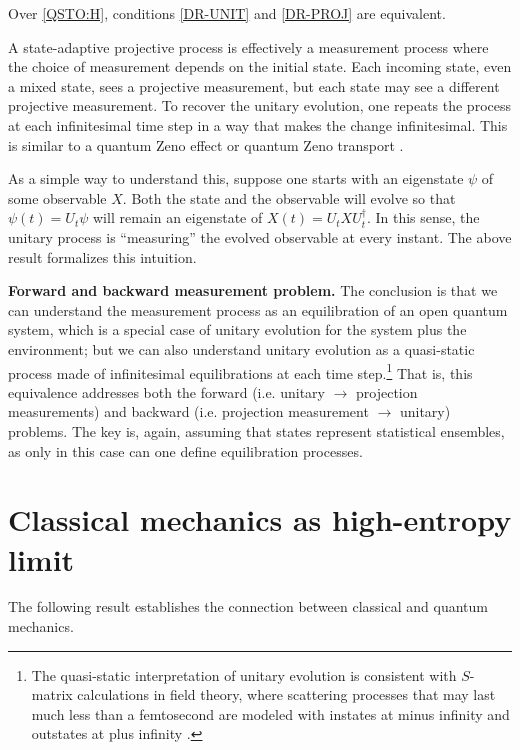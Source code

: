 \documentclass[entropy,article,submit,moreauthors]{Definitions/mdpi}
\begin{document}
\begin{Theorem}
	Over \ref{QSTO:H}, conditions \ref{DR-UNIT} and \ref{DR-PROJ} are equivalent.
\end{Theorem}

A state-adaptive projective process is effectively a measurement process where the choice of measurement depends on the initial state. Each incoming state, even a mixed state, sees a projective measurement, but each state may see a different projective measurement. To recover the unitary evolution, one repeats the process at each infinitesimal time step in a way that makes the change infinitesimal. This is similar to a quantum Zeno effect or quantum Zeno transport \cite{FacchiPascazio2008,BurgarthEtAl2013}.

As a simple way to understand this, suppose one starts with an eigenstate $\psi$ of some observable $X$. Both the state and the observable will evolve so that $\psi(t) = U_t \psi$ will remain an eigenstate of $X(t) = U_t X U^\dagger_t$. In this sense, the unitary process is ``measuring'' the evolved observable at every instant. The above result formalizes this intuition.

\textbf{Forward and backward measurement problem.} The conclusion is that we can understand the measurement process as an equilibration of an open quantum system, which is a special case of unitary evolution for the system plus the environment; but we can also understand unitary evolution as a quasi-static process made of infinitesimal equilibrations at each time step.\footnote{The quasi-static interpretation of unitary evolution is consistent with $S$-matrix calculations in field theory, where scattering processes that may last much less than a femtosecond are modeled with instates at minus infinity and outstates at plus infinity \cite{Weinberg1995}.} That is, this equivalence addresses both the forward (i.e. unitary $\to$ projection measurements) and backward (i.e. projection measurement $\to$ unitary) problems. The key is, again, assuming that states represent statistical ensembles, as only in this case can one define equilibration processes.

\section{Classical mechanics as high-entropy limit}

The following result establishes the connection between classical and quantum mechanics.
\end{document}
